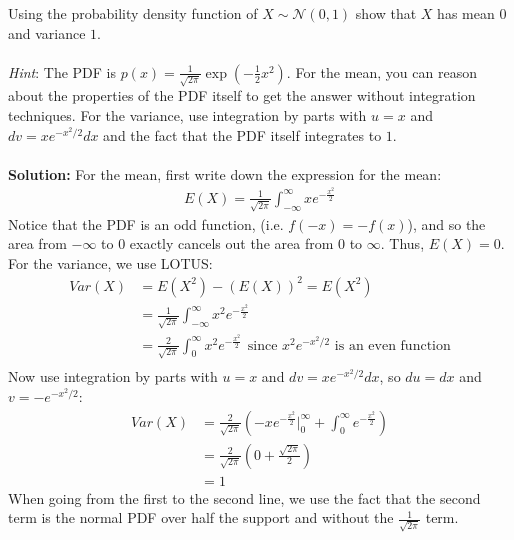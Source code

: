 \documentclass{harvardml}
\theoremstyle{definition}
\theoremstyle{plain}
\begin{document}
\begin{problem}
Using the probability density function of $X \sim \mathcal{N}(0, 1)$ show that $X$ has mean $0$ and variance $1$. \\
\\
\emph{Hint}: The PDF is $p(x) = \frac{1}{\sqrt{2\pi}} 
				\exp\left( -\frac{1}{2} x^2 \right).$ For the mean, you can reason about the properties of the PDF itself to get the answer without integration techniques. For the variance, use integration by parts with $u=x$ and $dv = xe^{-x^2/2} dx$ and the fact that the PDF itself integrates to $1$.
\\
\\
\textbf{Solution:} For the mean, first write down the expression for the mean: 
\begin{align*}
    E(X) = \frac{1}{\sqrt{2\pi}} \int_{-\infty}^{\infty} xe^{-\frac{x^2}{2}}
\end{align*}
Notice that the PDF is an odd function, (i.e. $f(-x) = -f(x)$), and so the area from $-\infty$ to $0$ exactly cancels out the area from $0$ to $\infty$. Thus, $E(X) = 0$.
\newline
For the variance, we use LOTUS:
\begin{align*}
    Var(X) &= E(X^2) - (E(X))^2 = E(X^2) \\
    &= \frac{1}{\sqrt{2\pi}} \int_{-\infty}^{\infty} x^2e^{-\frac{x^2}{2}} \\
        &= \frac{2}{\sqrt{2\pi}} \int_{0}^{\infty} x^2e^{-\frac{x^2}{2}} \hspace{5pt} \text{since $x^2e^{-x^2/2}$ is an even function}\\
\end{align*}
Now use integration by parts with $u = x$ and $dv = xe^{-x^2/2}dx$, so $du = dx$ and $v = -e^{-x^2/2}$:
\begin{align*}
    Var(X) &= \frac{2}{\sqrt{2\pi}} (-x e^{-\frac{x^2}{2}}\Big|_0^{\infty} + \int_{0}^{\infty} e^{-\frac{x^2}{2}})\\
    &= \frac{2}{\sqrt{2\pi}}(0 + \frac{\sqrt{2\pi}}{2}) \\
    &= 1
\end{align*}
When going from the first to the second line, we use the fact that the second term is the normal PDF over half the support and without the $\frac{1}{\sqrt{2\pi}}$ term. 
\end{problem}
\end{document}
